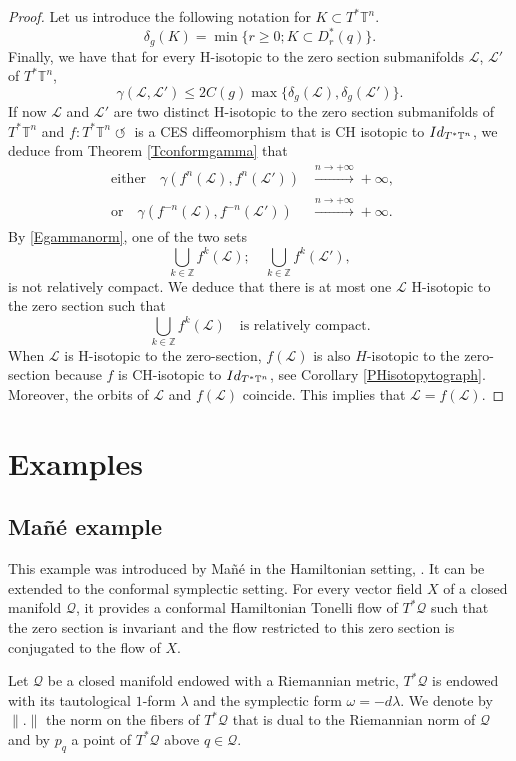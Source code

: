 \documentclass[11pt]{article}
\numberwithin{equation}{section}
\numberwithin{figure}{section}
\numberwithin{table}{section}
\providecommand{\righttoleftarrow}{\mathrel{\circlearrowleft}}
\theoremstyle{definition}
\def\Z{\mathbb{Z}}
\def\T{\mathbb{T}}
\def\cL{{\mathcal L}}
\def\cQ{{\mathcal Q}}
\begin{document}
\begin{proof}
Let us introduce the following notation for $K\subset T^*\T^n$.
\[
\delta_g(K)=\min\{r\geq 0; K\subset D^*_r(q)\}.
\]
Finally, we have that for every H-isotopic to the zero section submanifolds $\cL$, $\cL'$ of $T^*\T^n$,
\begin{equation}\label{Egammanorm}
\gamma(\cL, \cL')\leq 2C(g)\max\{\delta_g(\cL), \delta_g(\cL')\}.
\end{equation}
If now $\cL$ and $\cL'$ are two distinct H-isotopic to the zero section submanifolds of $T^*\T^n$ and $f: T^*\T^n \righttoleftarrow$ is a CES diffeomorphism that is CH isotopic to ${\rm Id}_{T^*\T^n}$, we deduce from Theorem \ref{Tconformgamma} that
\begin{align*}
\text{either}\quad\gamma (f^n(\cL), f^n(\cL'))&\xrightarrow[]{n\to +\infty}+\infty,\quad
\\
\text{or}\quad\gamma (f^{-n}(\cL), f^{-n}(\cL'))&\xrightarrow[]{n\to +\infty}+\infty.
\end{align*}
By \eqref{Egammanorm}, one of the two sets
\[
\bigcup_{k\in\Z}f^k(\cL);\quad \bigcup_{k\in\Z}f^k(\cL'),
\]
is not relatively compact. We deduce that there is at most one $\cL$ H-isotopic to the zero section such that
\[
\bigcup_{k\in\Z}f^k(\cL)\quad\text{is relatively compact}.
\]
When $\cL$ is H-isotopic to the zero-section, $f(\cL)$ is also $H$-isotopic to the zero-section because $f$ is CH-isotopic to ${\rm Id}_{T^*\T^n}$, see Corollary \ref{PHisotopytograph}. Moreover, the orbits of $\cL$ and $f(\cL)$ coincide. This implies that $\cL=f(\cL)$.
\end{proof}

\section{Examples}\label{AExamples}

\subsection{Mañé example}\label{SecMan}

This example was introduced by Mañé in the Hamiltonian setting, \cite{Man1992}. It can be extended to the conformal symplectic setting. For every vector field $X$ of a closed manifold $\cQ$, it provides a conformal Hamiltonian Tonelli flow of $T^*\cQ$ such that the zero section is invariant and the flow restricted to this zero section is conjugated to the flow of $X$.

Let $\cQ$ be a closed manifold endowed with a Riemannian metric, $T^*\cQ$ is endowed with its tautological $1$-form $\lambda$ and the symplectic form $\omega=-d\lambda$. We denote by $\|.\|$ the norm on the fibers of $T^*\cQ$ that is dual to the Riemannian norm of $\cQ$ and by $p_q$ a point of $T^*\cQ$ above $q \in \cQ$.
\end{document}
